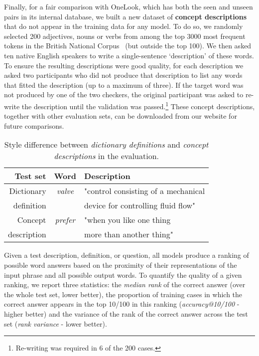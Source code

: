 Finally, for a fair comparison with OneLook, which has both the seen and unseen pairs in its internal database, we built a new dataset of {\bf concept descriptions} that do not appear in the training data for any model. To do so, we randomly selected 200 adjectives, nouns or verbs from among the top 3000 most frequent tokens in the British National Corpus~\cite{leech1994claws4} (but outside the top 100). We then asked ten native English speakers to write a single-sentence `description' of these words. To ensure the resulting descriptions were good quality, for each description we asked two participants who did not produce that description to list any words that fitted the description (up to a maximum of three). If the target word was not produced by one of the two checkers, the original participant was asked to re-write the description until the validation was passed.\footnote{Re-writing was required in 6 of the 200 cases.} These concept descriptions, together with other evaluation sets, can be downloaded from our website for future comparisons.

\begin{table}[ht]
{\small
\emph
\hfill{}
\begin{tabular}{r|cl}
\bf Test set & \bf Word & \bf Description \\
\hline
 Dictionary &   \emph{valve} & "control consisting of a mechanical   \\
definition  & & device for controlling fluid flow" \\ 
\rule{0pt}{2ex} 
Concept &   \emph{prefer} & "when you like one thing \\
description & & more than another thing" \\
\end{tabular}
\caption{Style difference between \emph{dictionary definitions} and \emph{concept descriptions} in the evaluation.}
\label{tb:tablename}}
\end{table}

Given a test description, definition, or question, all models produce a ranking of possible word answers based on the proximity of their representations of the input phrase and all possible output words. To quantify the quality of a given ranking, we report three statistics: the \emph{median rank} of the correct answer (over the whole test set, lower better), the proportion of training cases in which the correct answer appears in the top 10/100 in this ranking (\emph{accuracy@10/100} - higher better) and the variance of the rank of the correct answer across the test set (\emph{rank variance} - lower better). 

